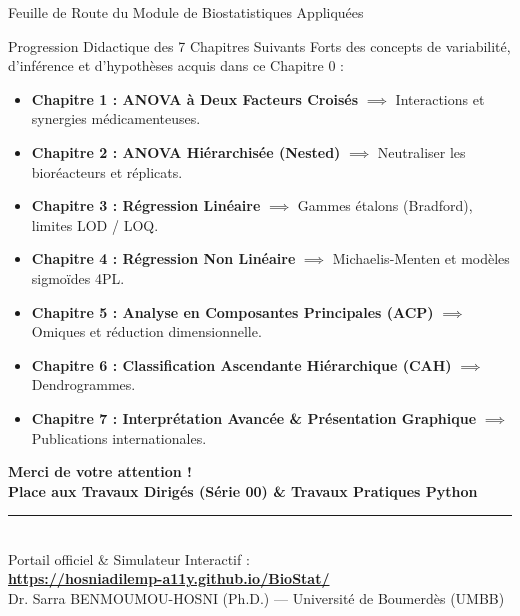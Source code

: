 \documentclass[aspectratio=169,10pt]{beamer}
\begin{document}
\begin{frame}{Feuille de Route du Module de Biostatistiques Appliquées}
  \begin{conceptbox}{Progression Didactique des 7 Chapitres Suivants}
    Forts des concepts de variabilité, d'inférence et d'hypothèses acquis dans ce Chapitre 0 :
  \end{conceptbox}
  \vspace{1.5mm}
  \begin{itemize}\setlength{\itemsep}{1.5pt}
    \item \textbf{Chapitre 1 : ANOVA à Deux Facteurs Croisés} $\implies$ Interactions et synergies médicamenteuses.
    \item \textbf{Chapitre 2 : ANOVA Hiérarchisée (Nested)} $\implies$ Neutraliser les bioréacteurs et réplicats.
    \item \textbf{Chapitre 3 : Régression Linéaire} $\implies$ Gammes étalons (Bradford), limites LOD / LOQ.
    \item \textbf{Chapitre 4 : Régression Non Linéaire} $\implies$ Michaelis-Menten et modèles sigmoïdes 4PL.
    \item \textbf{Chapitre 5 : Analyse en Composantes Principales (ACP)} $\implies$ Omiques et réduction dimensionnelle.
    \item \textbf{Chapitre 6 : Classification Ascendante Hiérarchique (CAH)} $\implies$ Dendrogrammes.
    \item \textbf{Chapitre 7 : Interprétation Avancée \& Présentation Graphique} $\implies$ Publications internationales.
  \end{itemize}
\end{frame}

\begin{frame}[plain]
  \begin{center}
    \vspace{1.5cm}
    {\Huge\color{BioNavy}\textbf{Merci de votre attention !}}\\[0.8cm]
    {\large\color{BioTeal}\textbf{Place aux Travaux Dirigés (Série 00) \& Travaux Pratiques Python}}\\[0.5cm]
    \rule{0.5\linewidth}{1pt}\\[0.5cm]
    {\small\color{BioDark}Portail officiel \& Simulateur Interactif :\\
    \textbf{\url{https://hosniadilemp-a11y.github.io/BioStat/}}}\\[0.4cm]
    {\footnotesize\color{BioDark!70}Dr. Sarra BENMOUMOU-HOSNI (Ph.D.) --- Université de Boumerdès (UMBB)}
  \end{center}
\end{frame}
\end{document}

